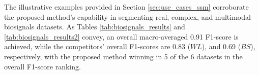 \begin{table}[H]
    \centering
    \caption{Results to summarize the comparison between the methods tested. In this table, each record of each dataset is counted for each method as a win, draw or loss. The count is made for each dataset and finally, for all datasets altogether (W|D|L).}
    \label{tab:biosignals_results2}
\end{table}

The illustrative examples provided in Section \ref{sec:use_cases_ssm} corroborate the proposed method's capability in segmenting real, complex, and multimodal biosignals datasets. As Tables \ref{tab:biosignals_results} and \ref{tab:biosignals_results2} convey, an overall macro-averaged 0.91 F1-score is achieved, while the competitors' overall F1-scores are 0.83 ($WL$), and 0.69 ($BS$), respectively, with the proposed method winning in 5 of the 6 datasets in the overall F1-score ranking.

